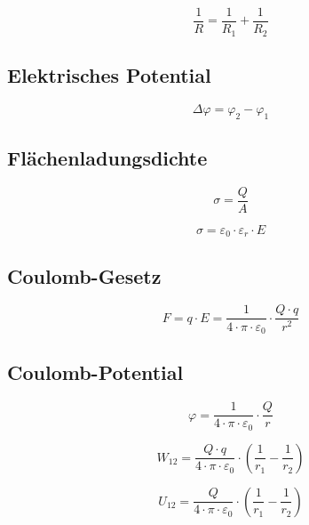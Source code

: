 \begin{equation}\label{eq:widerstand:parallelschaltung:widerstand}
\frac{1}{R} = \frac{1}{R_1} + \frac{1}{R_2} 
\end{equation}

\subsection{Elektrisches Potential}
\begin{equation}\label{eq:elektrisches:potential}
\Delta \varphi = \varphi_2 - \varphi_1
\end{equation}

\subsection{Flächenladungsdichte}
\begin{equation}\label{eq:flaechenladungsdichte}
\sigma = \frac{Q}{A}
\end{equation}

\begin{equation}\label{eq:flaechenladungsdichte:feld}
\sigma = \varepsilon_0 \cdot \varepsilon_r \cdot E
\end{equation}

\subsection{Coulomb-Gesetz}
\begin{equation}\label{eq:coulomb:gesetz}
F = q \cdot E = \frac{1}{4\cdot \pi \cdot \varepsilon_0}\cdot \frac{Q \cdot
 q}{r^2}
\end{equation}

\subsection{Coulomb-Potential}
\begin{equation}\label{eq:coulomb:potential}
\varphi = \frac{1}{4\cdot \pi \cdot \varepsilon_0}\cdot \frac{Q}{r}
\end{equation}

\begin{equation}\label{eq:coulomb:potential:energie}
W_{12} = \frac{Q \cdot q}{4\cdot \pi \cdot
 \varepsilon_0}\cdot\left(\frac{1}{r_1} - \frac{1}{r_2}\right)
\end{equation}

\begin{equation}\label{eq:coulomb:potential:spannung}
U_{12} = \frac{Q}{4\cdot \pi \cdot
 \varepsilon_0}\cdot\left(\frac{1}{r_1} - \frac{1}{r_2}\right)
\end{equation}

